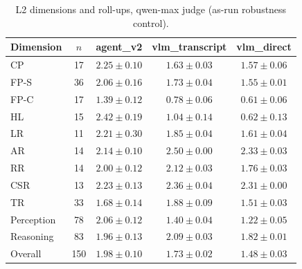 \begin{table}[h]
  \centering
  \small
  \caption{L2 dimensions and roll-ups, qwen-max judge (as-run robustness control).}
  \label{tab:l2qwen}
  \begin{tabular}{@{}lcccc@{}}
    \toprule
    Dimension & $n$ & agent\_v2 & vlm\_transcript & vlm\_direct \\
    \midrule
    CP & 17 & $2.25 \pm 0.10$ & $1.63 \pm 0.03$ & $1.57 \pm 0.06$ \\
    FP-S & 36 & $2.06 \pm 0.16$ & $1.73 \pm 0.04$ & $1.55 \pm 0.01$ \\
    FP-C & 17 & $1.39 \pm 0.12$ & $0.78 \pm 0.06$ & $0.61 \pm 0.06$ \\
    HL & 15 & $2.42 \pm 0.19$ & $1.04 \pm 0.14$ & $0.62 \pm 0.13$ \\
    LR & 11 & $2.21 \pm 0.30$ & $1.85 \pm 0.04$ & $1.61 \pm 0.04$ \\
    AR & 14 & $2.14 \pm 0.10$ & $2.50 \pm 0.00$ & $2.33 \pm 0.03$ \\
    RR & 14 & $2.00 \pm 0.12$ & $2.12 \pm 0.03$ & $1.76 \pm 0.03$ \\
    CSR & 13 & $2.23 \pm 0.13$ & $2.36 \pm 0.04$ & $2.31 \pm 0.00$ \\
    TR & 33 & $1.68 \pm 0.14$ & $1.88 \pm 0.09$ & $1.51 \pm 0.03$ \\
    \midrule
    Perception & 78 & $2.06 \pm 0.12$ & $1.40 \pm 0.04$ & $1.22 \pm 0.05$ \\
    Reasoning & 83 & $1.96 \pm 0.13$ & $2.09 \pm 0.03$ & $1.82 \pm 0.01$ \\
    Overall & 150 & $1.98 \pm 0.10$ & $1.73 \pm 0.02$ & $1.48 \pm 0.03$ \\
    \bottomrule
  \end{tabular}
\end{table}
